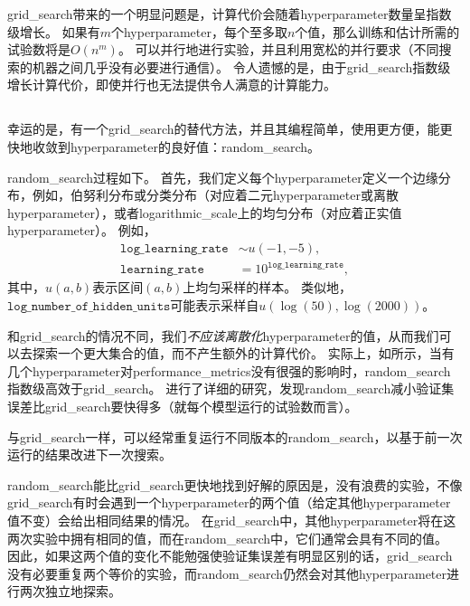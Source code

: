 
\gls{grid_search}带来的一个明显问题是，计算代价会随着\gls{hyperparameter}数量呈指数级增长。
如果有$m$个\gls{hyperparameter}，每个至多取$n$个值，那么训练和估计所需的试验数将是$O(n^m)$。
可以并行地进行实验，并且利用宽松的并行要求（不同搜索的机器之间几乎没有必要进行通信）。
令人遗憾的是，由于\gls{grid_search}指数级增长计算代价，即使并行也无法提供令人满意的计算能力。


\subsection{}
\label{sec:random_search}
幸运的是，有一个\gls{grid_search}的替代方法，并且其编程简单，使用更方便，能更快地收敛到\gls{hyperparameter}的良好值：\gls{random_search}\citep{Bergstra+Bengio-2012-small}。

\gls{random_search}过程如下。
首先，我们定义每个\gls{hyperparameter}定义一个边缘分布，例如，伯努利分布或分类分布（对应着二元\gls{hyperparameter}或离散\gls{hyperparameter}），或者\gls{logarithmic_scale}上的均匀分布（对应着正实值\gls{hyperparameter}）。
例如，
\begin{align}
	\texttt{log\_learning\_rate} &\sim u(-1, -5), \\
	\texttt{learning\_rate} &= 10^{\texttt{log\_learning\_rate}},
\end{align}
其中，$u(a,b)$表示区间$(a,b)$上均匀采样的样本。
类似地，$\texttt{log\_number\_of\_hidden\_units}$可能表示采样自$u(\log(50), \log(2000))$。

和\gls{grid_search}的情况不同，我们\emph{不应该离散化}\gls{hyperparameter}的值，从而我们可以去探索一个更大集合的值，而不产生额外的计算代价。
实际上，如所示，当有几个\gls{hyperparameter}对\gls{performance_metrics}没有很强的影响时，\gls{random_search}指数级高效于\gls{grid_search}。
\cite{Bergstra+Bengio-2012-small}进行了详细的研究，发现\gls{random_search}减小验证集误差比\gls{grid_search}要快得多（就每个模型运行的试验数而言）。

与\gls{grid_search}一样，可以经常重复运行不同版本的\gls{random_search}，以基于前一次运行的结果改进下一次搜索。

\gls{random_search}能比\gls{grid_search}更快地找到好解的原因是，没有浪费的实验，不像\gls{grid_search}有时会遇到一个\gls{hyperparameter}的两个值（给定其他\gls{hyperparameter}值不变）会给出相同结果的情况。
在\gls{grid_search}中，其他\gls{hyperparameter}将在这两次实验中拥有相同的值，而在\gls{random_search}中，它们通常会具有不同的值。
因此，如果这两个值的变化不能勉强使验证集误差有明显区别的话，\gls{grid_search}没有必要重复两个等价的实验，而\gls{random_search}仍然会对其他\gls{hyperparameter}进行两次独立地探索。

